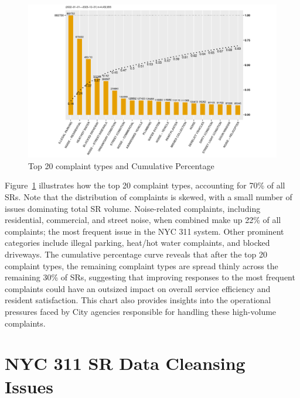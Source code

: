 \documentclass[linenumber]{jdsart}
\begin{document}
\begin{figure}[tbp]
 \centering
  \includegraphics[width = \textwidth]{SR_by_Complaint_Type.pdf} 
  \caption{Top 20 complaint types and Cumulative Percentage} 
  \label{fig:SR_complaints}
\end{figure}

Figure~\ref{fig:SR_complaints}
illustrates how the top 20 complaint types, accounting for 70\% 
of all SRs. Note that the distribution of complaints is skewed, 
with a small number of issues dominating total SR volume. 
Noise-related complaints, including residential, commercial, and 
street noise, when combined make up 22\% of all 
complaints; the most frequent issue in the NYC 311 system. 
Other prominent categories include illegal parking, heat/hot water 
complaints, and blocked driveways. The cumulative percentage curve 
reveals that after the top 20 complaint types, the remaining 
complaint types are spread thinly across the remaining 30\% of SRs,
suggesting that improving responses to the most frequent 
complaints could have an outsized impact on overall service 
efficiency and resident satisfaction. This chart also provides 
insights into the operational pressures faced by City agencies 
responsible for handling these high-volume complaints.


\section{NYC 311 SR Data Cleansing Issues} 
\label{sec:issues}
\end{document}
